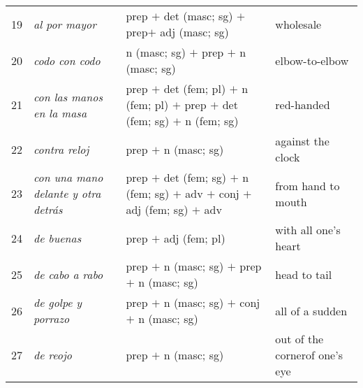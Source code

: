 \documentclass[output=paper]{langsci/langscibook}
\begin{document}
\begin{table}
\begin{tabularx}{\textwidth}{c@{~}>{\raggedright}p{2cm}Q@{}p{3cm}}
19 & \textit{al por mayor} & prep $+$ det (masc; sg) $+$ prep\newline  $+$ adj (masc; sg) & wholesale \\
20 & \textit{codo con codo} & n (masc; sg) $+$ prep $+$ n (masc; sg) & elbow-to-elbow \\
21 & \textit{con las manos en la masa} & prep $+$ det (fem; pl) $+$ n (fem; pl) $+$  prep \newline $+$ det (fem; sg) $+$ n (fem; sg)& red-handed \\
22 & \textit{contra reloj} & prep $+$ n (masc; sg) & against the clock \\
23 & \textit{con una mano delante y otra detrás} &  prep $+$ det (fem; sg) $+$ n (fem; sg) $+$ adv \newline $+$ conj $+$ adj (fem; sg) $+$ adv& from hand to mouth \\
24 & \textit{de buenas} & prep $+$ adj (fem; pl) & with all one's heart \\
25 & \textit{de cabo a rabo} & prep $+$ n (masc; sg) $+$ prep $+$ n (masc; sg) & head to tail \\
26 & \textit{de golpe y porrazo} & prep $+$ n (masc; sg) $+$ conj $+$ n (masc; sg) & all of a sudden \\
27 & \textit{de reojo} & prep $+$ n (masc; sg) &  out of the corner\newline of one's eye \\
\midrule
\end{tabularx}
\end{table}
\end{document}
